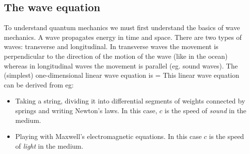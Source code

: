 \documentclass{Textbook}
\begin{document}
\subsection{The wave equation}
To understand quantum mechanics we must first understand the basics of wave mechanics. A wave propagates energy in time and space. There are two types of waves: transverse and longitudinal. In transverse waves the movement is perpendicular to the direction of the motion of the wave (like in the ocean) whereas in longitudinal waves the movement is parallel (eg. sound waves).\nl
The (simplest) one-dimensional linear wave equation is
\be
{} =   
\ee
This linear wave equation can be derived from eg:
\begin{itemize}
\item Taking a string, dividing it into differential segments of weights connected by springs and writing Newton's laws. In this case, $c$ is the speed of \emph{sound} in the medium.
\item Playing with Maxwell's electromagnetic equations. In this case $c$ is the speed of \emph{light} in the medium.
\end{itemize}
\end{document}
